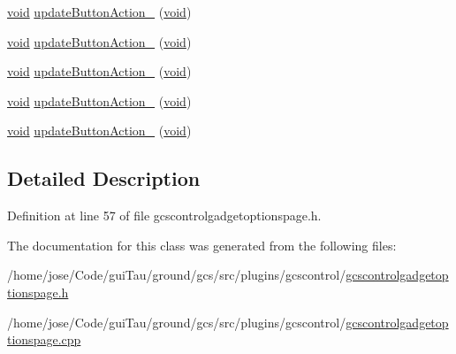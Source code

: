 \begin{DoxyCompactItemize}
\item 
\hyperlink{group___u_a_v_objects_plugin_ga444cf2ff3f0ecbe028adce838d373f5c}{void} \hyperlink{group___g_c_s_control_gadget_plugin_gae9f48cda98010eea595957d5674e7df3}{update\-Button\-Action\-\_} (\hyperlink{group___u_a_v_objects_plugin_ga444cf2ff3f0ecbe028adce838d373f5c}{void})
\item 
\hyperlink{group___u_a_v_objects_plugin_ga444cf2ff3f0ecbe028adce838d373f5c}{void} \hyperlink{group___g_c_s_control_gadget_plugin_ga667ae55b05e2c319a622450298807d0d}{update\-Button\-Action\-\_} (\hyperlink{group___u_a_v_objects_plugin_ga444cf2ff3f0ecbe028adce838d373f5c}{void})
\item 
\hyperlink{group___u_a_v_objects_plugin_ga444cf2ff3f0ecbe028adce838d373f5c}{void} \hyperlink{group___g_c_s_control_gadget_plugin_ga90dee04d87421e1af638ad7b1dea6aa8}{update\-Button\-Action\-\_} (\hyperlink{group___u_a_v_objects_plugin_ga444cf2ff3f0ecbe028adce838d373f5c}{void})
\item 
\hyperlink{group___u_a_v_objects_plugin_ga444cf2ff3f0ecbe028adce838d373f5c}{void} \hyperlink{group___g_c_s_control_gadget_plugin_ga918d017e724202b8224174985267c978}{update\-Button\-Action\-\_} (\hyperlink{group___u_a_v_objects_plugin_ga444cf2ff3f0ecbe028adce838d373f5c}{void})
\item 
\hyperlink{group___u_a_v_objects_plugin_ga444cf2ff3f0ecbe028adce838d373f5c}{void} \hyperlink{group___g_c_s_control_gadget_plugin_ga9b65e1b928dfafa1fa9d78aaa39c16df}{update\-Button\-Action\-\_} (\hyperlink{group___u_a_v_objects_plugin_ga444cf2ff3f0ecbe028adce838d373f5c}{void})
\end{DoxyCompactItemize}


\subsection{Detailed Description}


Definition at line 57 of file gcscontrolgadgetoptionspage.\-h.



The documentation for this class was generated from the following files\-:\begin{DoxyCompactItemize}
\item 
/home/jose/\-Code/gui\-Tau/ground/gcs/src/plugins/gcscontrol/\hyperlink{gcscontrolgadgetoptionspage_8h}{gcscontrolgadgetoptionspage.\-h}\item 
/home/jose/\-Code/gui\-Tau/ground/gcs/src/plugins/gcscontrol/\hyperlink{gcscontrolgadgetoptionspage_8cpp}{gcscontrolgadgetoptionspage.\-cpp}\end{DoxyCompactItemize}
